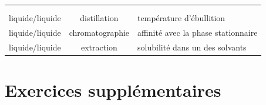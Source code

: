 \documentclass[
  11pt,
  french,
  a4paper,
  openany]{book}
\begin{document}
\begin{longtable}[]{@{}ccl@{}}
\begin{minipage}[t]{0.44\columnwidth}
\end{minipage}\tabularnewline
\begin{minipage}[t]{0.19\columnwidth}\centering
\strut
\end{minipage} & \begin{minipage}[t]{0.28\columnwidth}\centering
\strut
\end{minipage} & \begin{minipage}[t]{0.44\columnwidth}\raggedright
\strut
\end{minipage}\tabularnewline
\begin{minipage}[t]{0.19\columnwidth}\centering
liquide/liquide\strut
\end{minipage} & \begin{minipage}[t]{0.28\columnwidth}\centering
distillation\strut
\end{minipage} & \begin{minipage}[t]{0.44\columnwidth}\raggedright
température d'ébullition\strut
\end{minipage}\tabularnewline
\begin{minipage}[t]{0.19\columnwidth}\centering
liquide/liquide\strut
\end{minipage} & \begin{minipage}[t]{0.28\columnwidth}\centering
chromatographie\strut
\end{minipage} & \begin{minipage}[t]{0.44\columnwidth}\raggedright
affinité avec la phase stationnaire\strut
\end{minipage}\tabularnewline
\begin{minipage}[t]{0.19\columnwidth}\centering
liquide/liquide\strut
\end{minipage} & \begin{minipage}[t]{0.28\columnwidth}\centering
extraction\strut
\end{minipage} & \begin{minipage}[t]{0.44\columnwidth}\raggedright
solubilité dans un des solvants\strut
\end{minipage}\tabularnewline
\bottomrule
\end{longtable}

\newpage

\hypertarget{exercices-suppluxe9mentaires-2}{%
\section{Exercices supplémentaires}\label{exercices-suppluxe9mentaires-2}}
\end{document}
